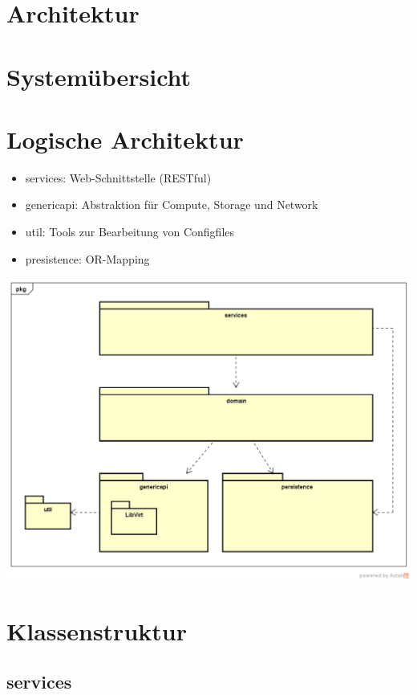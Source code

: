 \section{Architektur}

\section{Systemübersicht}

\section{Logische Architektur}
\begin{itemize}
	\item services: Web-Schnittstelle (RESTful)
	\item genericapi: Abstraktion für Compute, Storage und Network
	\item util: Tools zur Bearbeitung von Configfiles
	\item presistence: OR-Mapping
\end{itemize}

\begin{center}
\includegraphics[width=\textwidth]{./05_Design/04_Architektur/LogischeSicht}
\end{center}

\newpage

\section{Klassenstruktur}

\subsection{services}

